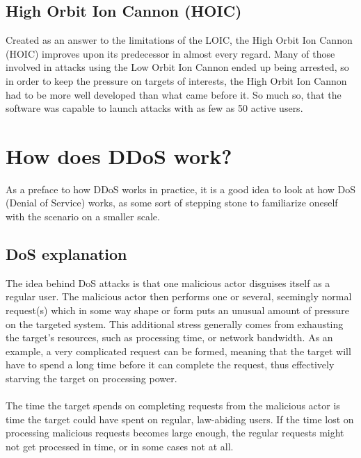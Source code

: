 \documentclass[a4paper, titlepage,12pt]{article}
\begin{document}
	\subsection{High Orbit Ion Cannon (HOIC)}
		Created as an answer to the limitations of the LOIC, the High Orbit Ion Cannon (HOIC) improves upon its predecessor in almost every regard. Many of those involved in attacks using the Low Orbit Ion Cannon ended up being arrested, so in order to keep the pressure on targets of interests, the High Orbit Ion Cannon had to be more well developed than what came before it\cite{changeapproach}. So much so, that the software was capable to launch attacks with as few as 50 active users.
	\section{How does DDoS work?}
		As a preface to how DDoS works in practice, it is a good idea to look at how DoS (Denial of Service) works, as some sort of stepping stone to familiarize oneself with the scenario on a smaller scale. 
	\subsection{DoS explanation}
		The idea behind DoS attacks is that one malicious actor disguises itself as a regular user. The malicious actor then performs one or several, seemingly normal request(s) which in some way shape or form puts an unusual amount of pressure on the targeted system. This additional stress generally comes from exhausting the target's resources, such as processing time, or network bandwidth. As an example, a very complicated request can be formed, meaning that the target will have to spend a long time before it can complete the request, thus effectively starving the target on processing power. 
\\\\
		The time the target spends on completing requests from the malicious actor is time the target could have spent on regular, law-abiding users. If the time lost on processing malicious requests becomes large enough, the regular requests might not get processed in time, or in some cases not at all.
\end{document}
